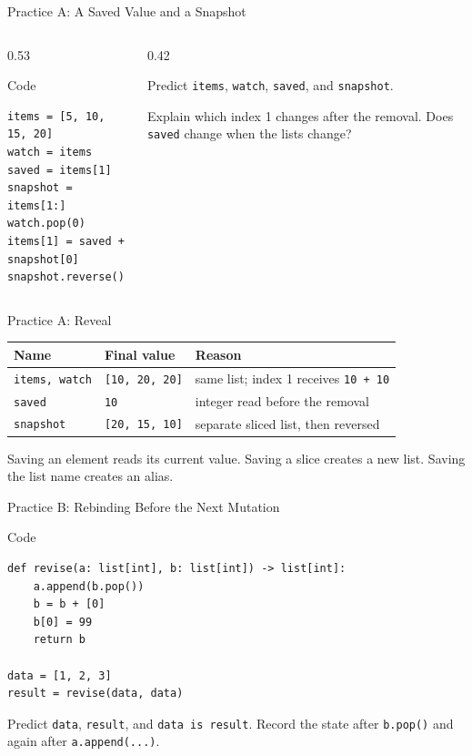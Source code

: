 \documentclass[aspectratio=169,10pt]{beamer}
\begin{document}
\begin{frame}[fragile]{Practice A: A Saved Value and a Snapshot}
  \begin{columns}[T,onlytextwidth]
    \begin{column}{0.53\textwidth}
      \begin{block}{Code}
\begin{verbatim}
items = [5, 10, 15, 20]
watch = items
saved = items[1]
snapshot = items[1:]
watch.pop(0)
items[1] = saved + snapshot[0]
snapshot.reverse()
\end{verbatim}
      \end{block}
    \end{column}
    \begin{column}{0.42\textwidth}
      \begin{activity}
        Predict \texttt{items}, \texttt{watch}, \texttt{saved}, and \texttt{snapshot}.

        Explain which index 1 changes after the removal. Does \texttt{saved} change when the lists change?
      \end{activity}
    \end{column}
  \end{columns}
\end{frame}

\begin{frame}{Practice A: Reveal}
  \begin{center}
    \renewcommand{\arraystretch}{1.4}
    \begin{tabular}{l|l|l}
      \textbf{Name} & \textbf{Final value} & \textbf{Reason} \\\hline
      \texttt{items, watch} & \texttt{[10, 20, 20]} & same list; index 1 receives \texttt{10 + 10} \\
      \texttt{saved} & \texttt{10} & integer read before the removal \\
      \texttt{snapshot} & \texttt{[20, 15, 10]} & separate sliced list, then reversed
    \end{tabular}
  \end{center}
  \begin{keyidea}
    Saving an element reads its current value. Saving a slice creates a new list. Saving the list name creates an alias.
  \end{keyidea}
\end{frame}

\begin{frame}[fragile]{Practice B: Rebinding Before the Next Mutation}
  \begin{block}{Code}
\begin{verbatim}
def revise(a: list[int], b: list[int]) -> list[int]:
    a.append(b.pop())
    b = b + [0]
    b[0] = 99
    return b

data = [1, 2, 3]
result = revise(data, data)
\end{verbatim}
  \end{block}
  \begin{activity}
    Predict \texttt{data}, \texttt{result}, and \texttt{data is result}. Record the state after \texttt{b.pop()} and again after \texttt{a.append(...)}.
  \end{activity}
\end{frame}
\end{document}
